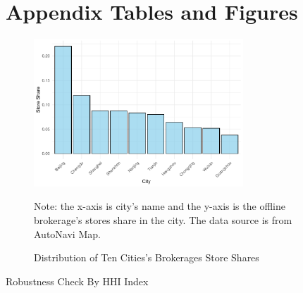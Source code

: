 \documentclass[11pt]{article}
\begin{document}


\newpage
\appendix
\setcounter{table}{0}
\renewcommand{\tablename}{Appendix Table}
\renewcommand{\figurename}{Appendix Figure}
\renewcommand{\thetable}{A\arabic{table}}
\setcounter{figure}{0}
\renewcommand{\thefigure}{A\arabic{figure}}

\section{Appendix Tables and Figures}

\begin{figure}
  \centering
  \includegraphics[width=0.7\textwidth]{../figures/distribution_of_ten_cities.pdf}
  \caption{Distribution of Ten Cities's Brokerages Store Shares}
  \label{fig:distribution_store_shares}
  Note: the x-axis is city's name and the y-axis is the offline brokerage's stores share in the city. The data source is from AutoNavi Map.
\end{figure}

% 









\clearpage

\begin{table}[H]
  \begin{center}
    \begin{scriptsize}
    \caption{Robustness Check By HHI Index}
    \label{tab:dynamic_hhi}
      
  
    \end{scriptsize}
  \end{center}
\end{table}
\end{document}

